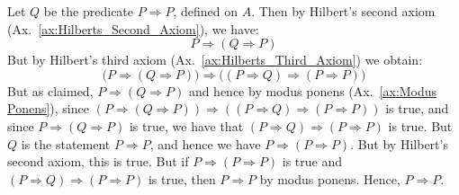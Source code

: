     \begin{bproof}
        Let $Q$ be the predicate $P\Rightarrow{P}$, defined on $A$. Then by
        Hilbert's second axiom (Ax.~\ref{ax:Hilberts_Second_Axiom}), we have:
        \begin{equation}
            P\Rightarrow(Q\Rightarrow{P})
        \end{equation}
        But by Hilbert's third axiom (Ax.~\ref{ax:Hilberts_Third_Axiom}) we
        obtain:
        \begin{equation}
            \big(
                P\Rightarrow(Q\Rightarrow{P})
            \big)\Rightarrow
            \big(
                (P\Rightarrow{Q})\Rightarrow(P\Rightarrow{P})
            \big)
        \end{equation}
        But as claimed, $P\Rightarrow(Q\Rightarrow{P})$ and hence by
        modus ponens (Ax.~\ref{ax:Modus Ponens}), since
        $(P\Rightarrow(Q\Rightarrow{P}))\Rightarrow%
         ((P\Rightarrow{Q})\Rightarrow(P\Rightarrow{P}))$
        is true, and since $P\Rightarrow(Q\Rightarrow{P})$ is true, we have that
        $(P\Rightarrow{Q})\Rightarrow(P\Rightarrow{P})$ is true. But $Q$ is the
        statement $P\Rightarrow{P}$, and hence we have
        $P\Rightarrow(P\Rightarrow{P})$. But by Hilbert's second axiom, this is
        true. But if $P\Rightarrow(P\Rightarrow{P})$ is true and
        $(P\Rightarrow{Q})\Rightarrow(P\Rightarrow{P})$ is true, then
        $P\Rightarrow{P}$ by modus ponens. Hence, $P\Rightarrow{P}$.
    \end{bproof}
